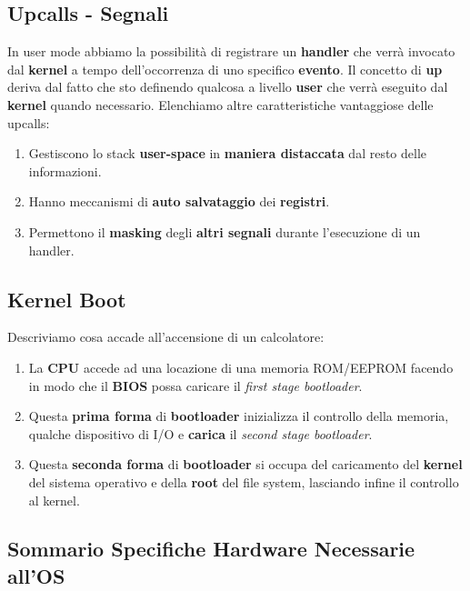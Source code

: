 \documentclass{article}
\begin{document}
\subsection{Upcalls - Segnali}

In user mode abbiamo la possibilità di registrare un \textbf{handler} che verrà invocato dal \textbf{kernel} a tempo dell'occorrenza di uno specifico \textbf{evento}. Il concetto di \textbf{up} deriva dal fatto che sto definendo qualcosa a livello \textbf{user} che verrà eseguito dal \textbf{kernel} quando necessario. Elenchiamo altre caratteristiche vantaggiose delle upcalls:

\begin{enumerate}
    \item Gestiscono lo stack \textbf{user-space} in \textbf{maniera distaccata} dal resto delle informazioni.
    \item Hanno meccanismi di \textbf{auto salvataggio} dei \textbf{registri}.
    \item Permettono il \textbf{masking} degli \textbf{altri segnali} durante l'esecuzione di un handler.
\end{enumerate}

\subsection{Kernel Boot}

Descriviamo cosa accade all'accensione di un calcolatore:

\begin{enumerate}
    \item La \textbf{CPU} accede ad una locazione di una memoria ROM/EEPROM facendo in modo che il \textbf{BIOS} possa caricare il \textit{first stage bootloader}.
    \item Questa \textbf{prima forma} di \textbf{bootloader} inizializza il controllo della memoria, qualche dispositivo di I/O e \textbf{carica} il \textit{second stage bootloader}.

\newpage

    \item Questa \textbf{seconda forma} di \textbf{bootloader} si occupa del caricamento del \textbf{kernel} del sistema operativo e della \textbf{root} del file system, lasciando infine il controllo al kernel.

\end{enumerate}

\subsection{Sommario Specifiche Hardware Necessarie all'OS}
\end{document}
